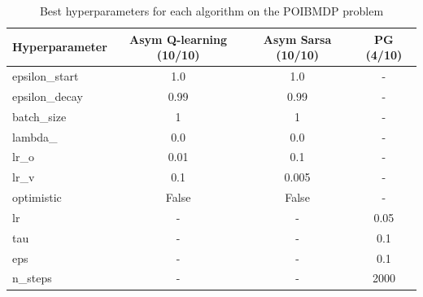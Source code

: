 \begin{table}[h]
    \centering
    \begin{tabular}{|l|c|c|c|}
    \textbf{Hyperparameter} & \textbf{Asym Q-learning (10/10)} & \textbf{Asym Sarsa (10/10)} & \textbf{PG (4/10)} \\
    \toprule
    epsilon\_start & 1.0 & 1.0 & - \\
    epsilon\_decay & 0.99 & 0.99 & - \\
    batch\_size & 1 & 1 & - \\
    lambda\_ & 0.0 & 0.0 & - \\
    lr\_o & 0.01 & 0.1 & - \\
    lr\_v & 0.1 & 0.005 & - \\
    optimistic & False & False & - \\
    lr & - & - & 0.05 \\
    tau & - & - & 0.1 \\
    eps & - & - & 0.1 \\
    n\_steps & - & - & 2000 \\
    \bottomrule
    \end{tabular}
    \caption{Best hyperparameters for each algorithm on the POIBMDP problem}
    \label{tab:algorithm-hyperparameters}
    \end{table}

